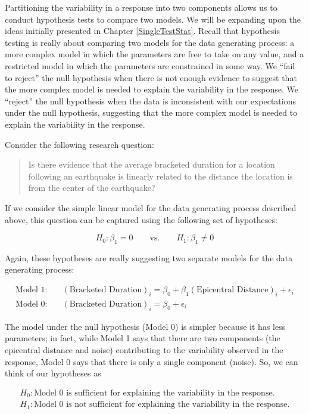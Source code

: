 \documentclass[]{book}
\theoremstyle{plain}
\theoremstyle{mydefn}
\theoremstyle{myexmpl}
\theoremstyle{remark}
\begin{document}
Partitioning the variability in a response into two components allows us
to conduct hypothesis tests to compare two models. We will be expanding
upon the ideas initially presented in Chapter \ref{SingleTestStat}.
Recall that hypothesis testing is really about comparing two models for
the data generating process: a more complex model in which the
parameters are free to take on any value, and a restricted model in
which the parameters are constrained in some way. We ``fail to reject''
the null hypothesis when there is not enough evidence to suggest that
the more complex model is needed to explain the variability in the
response. We ``reject'' the null hypothesis when the data is
inconsistent with our expectations under the null hypothesis, suggesting
that the more complex model is needed to explain the variability in the
response.

Consider the following research question:

\begin{quote}
Is there evidence that the average bracketed duration for a location
following an earthquake is linearly related to the distance the location
is from the center of the earthquake?
\end{quote}

If we consider the simple linear model for the data generating process
described above, this question can be captured using the following set
of hypotheses:

\[H_0: \beta_1 = 0 \qquad \text{vs.} \qquad H_1: \beta_1 \neq 0\]

Again, these hypotheses are really suggesting two separate models for
the data generating process:

\[
\begin{aligned}
  \text{Model 1}:& \quad (\text{Bracketed Duration})_i = \beta_0 + \beta_1 (\text{Epicentral Distance})_i + \epsilon_i \\
  \text{Model 0}:& \quad (\text{Bracketed Duration})_i = \beta_0 + \epsilon_i
\end{aligned}
\]

The model under the null hypothesis (Model 0) is simpler because it has
less parameters; in fact, while Model 1 says that there are two
components (the epicentral distance and noise) contributing to the
variability observed in the response, Model 0 says that there is only a
single component (noise). So, we can think of our hypotheses as

\[
\begin{aligned}
  H_0: \text{Model 0 is sufficient for explaining the variability in the response.} \\
  H_1: \text{Model 0 is not sufficient for explaining the variability in the response.}
\end{aligned}
\]
\end{document}
